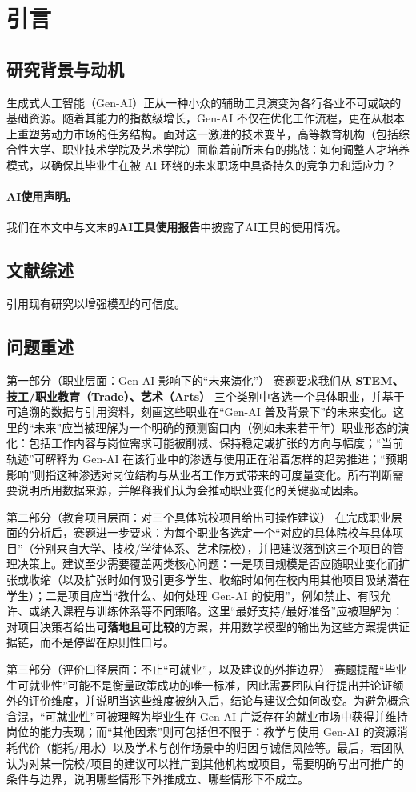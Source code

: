 \section{引言}
\subsection{研究背景与动机}
生成式人工智能（Gen-AI）正从一种小众的辅助工具演变为各行各业不可或缺的基础资源。随着其能力的指数级增长，Gen-AI 不仅在优化工作流程，更在从根本上重塑劳动力市场的任务结构。面对这一激进的技术变革，高等教育机构（包括综合性大学、职业技术学院及艺术学院）面临着前所未有的挑战：如何调整人才培养模式，以确保其毕业生在被 AI 环绕的未来职场中具备持久的竞争力和适应力？
\paragraph{AI使用声明。} 我们在本文中与文末的\textbf{AI工具使用报告}中披露了AI工具的使用情况。

\subsection{文献综述}
引用现有研究以增强模型的可信度。\cite{freyosborne2017}

\subsection{问题重述}
第一部分（职业层面：Gen-AI 影响下的“未来演化”）
赛题要求我们从 \textbf{STEM、技工/职业教育（Trade）、艺术（Arts）} 三个类别中各选一个具体职业，并基于可追溯的数据与引用资料，刻画这些职业在“Gen-AI 普及背景下”的未来变化。这里的“未来”应当被理解为一个明确的预测窗口内（例如未来若干年）职业形态的演化：包括工作内容与岗位需求可能被削减、保持稳定或扩张的方向与幅度；“当前轨迹”可解释为 Gen-AI 在该行业中的渗透与使用正在沿着怎样的趋势推进；“预期影响”则指这种渗透对岗位结构与从业者工作方式带来的可度量变化。所有判断需要说明所用数据来源，并解释我们认为会推动职业变化的关键驱动因素。 

第二部分（教育项目层面：对三个具体院校项目给出可操作建议）
在完成职业层面的分析后，赛题进一步要求：为每个职业各选定一个“对应的具体院校与具体项目”（分别来自大学、技校/学徒体系、艺术院校），并把建议落到这三个项目的管理决策上。建议至少需要覆盖两类核心问题：一是项目规模是否应随职业变化而扩张或收缩（以及扩张时如何吸引更多学生、收缩时如何在校内用其他项目吸纳潜在学生）；二是项目应当“教什么、如何处理 Gen-AI 的使用”，例如禁止、有限允许、或纳入课程与训练体系等不同策略。这里“最好支持/最好准备”应被理解为：对项目决策者给出\textbf{可落地且可比较}的方案，并用数学模型的输出为这些方案提供证据链，而不是停留在原则性口号。   

第三部分（评价口径层面：不止“可就业”，以及建议的外推边界）
赛题提醒“毕业生可就业性”可能不是衡量政策成功的唯一标准，因此需要团队自行提出并论证额外的评价维度，并说明当这些维度被纳入后，结论与建议会如何改变。为避免概念含混，“可就业性”可被理解为毕业生在 Gen-AI 广泛存在的就业市场中获得并维持岗位的能力表现；而“其他因素”则可包括但不限于：教学与使用 Gen-AI 的资源消耗代价（能耗/用水）以及学术与创作场景中的归因与诚信风险等。最后，若团队认为对某一院校/项目的建议可以推广到其他机构或项目，需要明确写出可推广的条件与边界，说明哪些情形下外推成立、哪些情形下不成立。 
